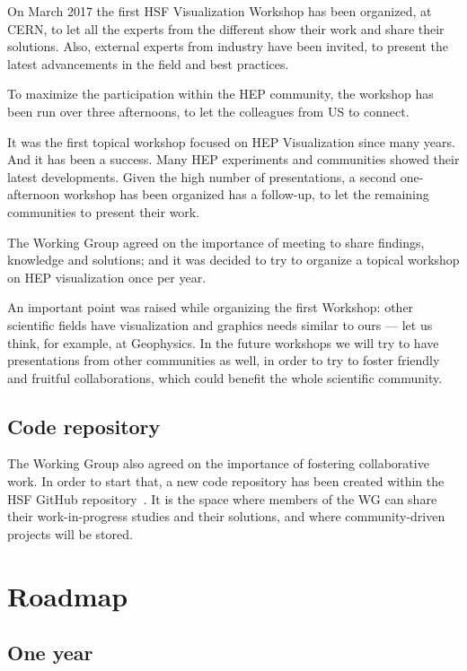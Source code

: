 \documentclass[12pt,a4paper]{article}
\begin{document}
On March 2017 the first HSF Visualization Workshop has been organized, at CERN, to let all the experts from the different
show their work and share their solutions. Also, external experts from industry have been invited, to present the latest
advancements in the field and best practices.

To maximize the participation within the HEP community, the workshop has been run over three afternoons, to let the
colleagues from US to connect.

It was the first topical workshop focused on HEP Visualization since many years. And it has been a success. Many HEP
experiments and communities showed their latest developments. Given the high number of presentations, a second one-afternoon
workshop has been organized has a follow-up, to let the remaining communities to present their work.

The Working Group agreed on the importance of meeting to share findings, knowledge and solutions; and it was decided to
try to organize a topical workshop on HEP visualization once per year.

An important point was raised while organizing the first Workshop: other scientific fields have visualization and
graphics needs similar to ours --- let us think, for example, at Geophysics. In the future workshops we will try to
have presentations from other communities as well, in order to try to foster friendly and fruitful collaborations,
which could benefit the whole scientific community.

\hypertarget{repo}{%
\subsection{Code repository}\label{repo}}

The Working Group also agreed on the importance of fostering collaborative work.
In order to start that, a new code repository has been created within the HSF GitHub repository~\cite{HSFVizRepo}.
It is the space where members of the WG can share their work-in-progress studies and their solutions, and where
community-driven projects will be stored.

\hypertarget{roadmap}{%
\section{Roadmap}\label{roadmap}}

\hypertarget{one-year}{%
\subsection{One year}\label{one-year}}
\end{document}
